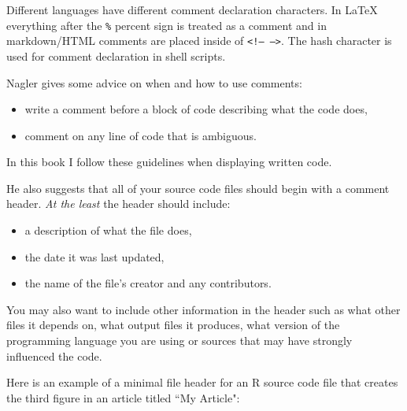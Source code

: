 Different languages have different comment declaration characters. In LaTeX everything after the {\tt{\%}} percent sign is treated as a comment and in markdown/HTML comments are placed inside of {\tt{\textless !-- --\textgreater}}. The hash character is used for comment declaration in shell scripts.

Nagler \citeyearpar[491]{Nagler1995} gives some advice on when and how to use comments:

\begin{itemize}
    \item write a comment before a block of code describing what the code does,
    \item comment on any line of code that is ambiguous.
\end{itemize}

\noindent In this book I follow these guidelines when displaying written code. 

He also suggests that all of your source code files should begin with a comment header. {\emph{At the least}} the header should include:

\begin{itemize}
    \item a description of what the file does,
    \item the date it was last updated,
    \item the name of the file's creator and any contributors.
\end{itemize}

\noindent You may also want to include other information in the header such as what other files it depends on, what output files it produces, what version of the programming language you are using or sources that may have strongly influenced the code. 

Here is an example of a minimal file header for an R source code file that creates the third figure in an article titled ``My Article":

\begin{knitrout}
\color{fgcolor}\begin{kframe}
\begin{alltt}
\hlcomment{##################}
\hlcomment{##################}
\end{alltt}
\end{kframe}
\end{knitrout}


